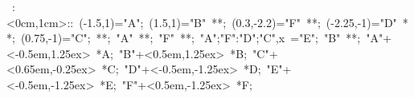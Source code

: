 

\hbox{
\xy    <1cm,0cm>:<0cm,1cm>::
       (-1.5,1)="A"; (1.5,1)="B" **\dir{-}; 
       (0.3,-2.2)="F" **\dir{-};
       (-2.25,-1)="D" **\dir{-}; 
       (0.75,-1)="C"; **\dir{-}; "A" **\dir{-}; "F" **\dir{-};
       {"A";"F":"D";"C",x} ="E";  "B" **\dir{-};
       "A"+<-0.5em,1.25ex> *{A};  
       "B"+<0.5em,1.25ex> *{B}; 
       "C"+<0.65em,-0.25ex> *{C}; 
       "D"+<-0.5em,-1.25ex> *{D}; 
       "E"+<-0.5em,-1.25ex> *{E}; 
       "F"+<0.5em,-1.25ex> *{F}; 
\endxy}
